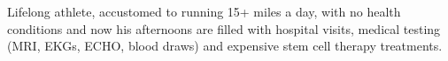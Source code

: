 Lifelong athlete, accustomed to running 15+ miles a day, with no health
conditions and now his afternoons are filled with hospital visits, medical
testing (MRI, EKGs, ECHO, blood draws) and expensive stem cell therapy
treatments.

